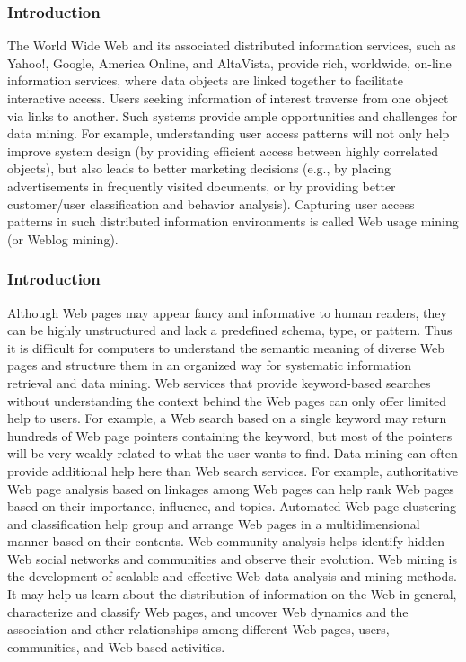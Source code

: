 \begin{frame}
    \frametitle{Introduction}
    \begin{minipage}{\textwidth}
        The World Wide Web and its associated distributed information services, such as
        Yahoo!, Google, America Online, and AltaVista, provide rich, worldwide, on-line information
        services, where data objects are linked together to facilitate interactive access.
        Users seeking information of interest traverse from one object via links to another.
        Such systems provide ample opportunities and challenges for data mining. For example,
        understanding user access patterns will not only help improve system design (by
        providing efficient access between highly correlated objects), but also leads to better
        marketing decisions (e.g., by placing advertisements in frequently visited documents,
        or by providing better customer/user classification and behavior analysis). Capturing
        user access patterns in such distributed information environments is called Web usage
        mining (or Weblog mining).
    \end{minipage}
\end{frame}

\begin{frame}
    \frametitle{Introduction}
    \begin{minipage}{\textwidth}        
        Although Web pages may appear fancy and informative to human readers, they can be
        highly unstructured and lack a predefined schema, type, or pattern. Thus it is difficult for
        computers to understand the semantic meaning of diverse Web pages and structure them
        in an organized way for systematic information retrieval and data mining. Web services
        that provide keyword-based searches without understanding the context behind the Web
        pages can only offer limited help to users. For example, a Web search based on a single
        keyword may return hundreds of Web page pointers containing the keyword, but most
        of the pointers will be very weakly related to what the user wants to find. Data mining
        can often provide additional help here than Web search services. For example, authoritative
        Web page analysis based on linkages among Web pages can help rank Web pages based on their importance, influence, and topics. Automated Web page clustering and
        classification help group and arrange Web pages in a multidimensional manner based
        on their contents. Web community analysis helps identify hidden Web social networks
        and communities and observe their evolution. Web mining is the development of scalable
        and effective Web data analysis and mining methods. It may help us learn about the
        distribution of information on the Web in general, characterize and classify Web pages,
        and uncover Web dynamics and the association and other relationships among different
        Web pages, users, communities, and Web-based activities.
    \end{minipage}
\end{frame}


